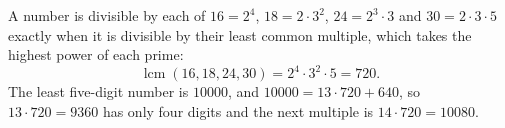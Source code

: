 A number is divisible by each of $16=2^4$, $18=2\cdot3^2$, $24=2^3\cdot3$ and $30=2\cdot3\cdot5$ exactly when it is divisible by their least common multiple, which takes the highest power of each prime:
\[
\operatorname{lcm}(16,18,24,30)=2^4\cdot3^2\cdot5=720 .
\]
The least five-digit number is $10000$, and $10000=13\cdot720+640$, so $13\cdot720=9360$ has only four digits and the next multiple is $14\cdot720=\boxed{10080}$.
